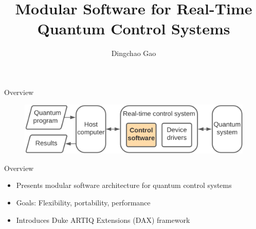 \documentclass[18 pt]{beamer}
\title{Modular Software for Real-Time Quantum Control Systems}
\author[Gcc]{Dingchao Gao}
\institute[ISCAS]{Institute of Software Chinese Academy of Sciences}
\begin{document}
\frame{\titlepage}

\begin{frame}{Overview}
  \begin{figure}
    \includegraphics[width=.8\textwidth]{real-time.png}
  \end{figure}
\end{frame}
\begin{frame}{Overview}
\begin{itemize}
\item Presents modular software architecture for quantum control systems
\item Goals: Flexibility, portability, performance
\item Introduces Duke ARTIQ Extensions (DAX) framework
\end{itemize}
\end{frame}
\end{document}

